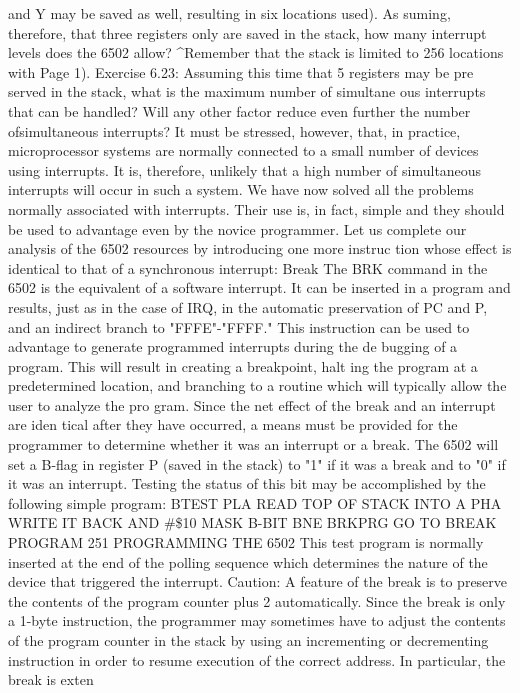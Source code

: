 \documentclass{book}
\begin{document}
and Y may be saved as well, resulting in six locations used). As
suming, therefore, that three registers only are saved in the stack,
how many interrupt levels does the 6502 allow? ^Remember that
the stack is limited to 256 locations with Page 1).
Exercise 6.23: Assuming this time that 5 registers may be pre
served in the stack, what is the maximum number of simultane
ous interrupts that can be handled? Will any other factor reduce even
further the number ofsimultaneous interrupts?
It must be stressed, however, that, in practice, microprocessor
systems are normally connected to a small number of devices
using interrupts. It is, therefore, unlikely that a high number of
simultaneous interrupts will occur in such a system.
We have now solved all the problems normally associated with
interrupts. Their use is, in fact, simple and they should be used to
advantage even by the novice programmer. Let us complete our
analysis of the 6502 resources by introducing one more instruc
tion whose effect is identical to that of a synchronous interrupt:
Break
The BRK command in the 6502 is the equivalent of a software
interrupt. It can be inserted in a program and results, just as in
the case of IRQ, in the automatic preservation of PC and P, and
an indirect branch to "FFFE"-"FFFF." This instruction can be
used to advantage to generate programmed interrupts during the de
bugging of a program. This will result in creating a breakpoint, halt
ing the program at a predetermined location, and branching to a
routine which will typically allow the user to analyze the pro
gram. Since the net effect of the break and an interrupt are iden
tical after they have occurred, a means must be provided for the
programmer to determine whether it was an interrupt or a break.
The 6502 will set a B-flag in register P (saved in the stack) to "1" if
it was a break and to "0" if it was an interrupt. Testing the status
of this bit may be accomplished by the following simple program:
BTEST PLA READ TOP OF STACK INTO A
PHA WRITE IT BACK
AND #\$10 MASK B-BIT
BNE BRKPRG GO TO BREAK PROGRAM
251
PROGRAMMING THE 6502
This test program is normally inserted at the end of the polling
sequence which determines the nature of the device that
triggered the interrupt.
Caution: A feature of the break is to preserve the contents of
the program counter plus 2 automatically. Since the break is only
a 1-byte instruction, the programmer may sometimes have to adjust
the contents of the program counter in the stack by using an
incrementing or decrementing instruction in order to resume
execution of the correct address. In particular, the break is exten
\end{document}
